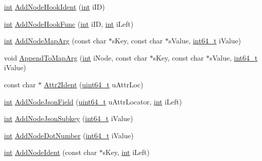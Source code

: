 \begin{DoxyCompactItemize}
\item 
\hyperlink{sphinxexpr_8cpp_a4a26e8f9cb8b736e0c4cbf4d16de985e}{int} \hyperlink{classExprParser__t_a31fa2dee046bcf1351fdcad5d32e8a59}{Add\-Node\-Hook\-Ident} (\hyperlink{sphinxexpr_8cpp_a4a26e8f9cb8b736e0c4cbf4d16de985e}{int} i\-I\-D)
\item 
\hyperlink{sphinxexpr_8cpp_a4a26e8f9cb8b736e0c4cbf4d16de985e}{int} \hyperlink{classExprParser__t_a25d811a727cd9cf9132578d8eb954711}{Add\-Node\-Hook\-Func} (\hyperlink{sphinxexpr_8cpp_a4a26e8f9cb8b736e0c4cbf4d16de985e}{int} i\-I\-D, \hyperlink{sphinxexpr_8cpp_a4a26e8f9cb8b736e0c4cbf4d16de985e}{int} i\-Left)
\item 
\hyperlink{sphinxexpr_8cpp_a4a26e8f9cb8b736e0c4cbf4d16de985e}{int} \hyperlink{classExprParser__t_a399cc3ba50a9fb3279cce14ac59190c6}{Add\-Node\-Map\-Arg} (const char $\ast$s\-Key, const char $\ast$s\-Value, \hyperlink{sphinxstd_8h_a996e72f71b11a5bb8b3b7b6936b1516d}{int64\-\_\-t} i\-Value)
\item 
void \hyperlink{classExprParser__t_abe7a23d9bf13b0e9e3c4b40ba6943caa}{Append\-To\-Map\-Arg} (\hyperlink{sphinxexpr_8cpp_a4a26e8f9cb8b736e0c4cbf4d16de985e}{int} i\-Node, const char $\ast$s\-Key, const char $\ast$s\-Value, \hyperlink{sphinxstd_8h_a996e72f71b11a5bb8b3b7b6936b1516d}{int64\-\_\-t} i\-Value)
\item 
const char $\ast$ \hyperlink{classExprParser__t_a8da806929f26afc62899fe2d5e31fe98}{Attr2\-Ident} (\hyperlink{sphinxstd_8h_aaa5d1cd013383c889537491c3cfd9aad}{uint64\-\_\-t} u\-Attr\-Loc)
\item 
\hyperlink{sphinxexpr_8cpp_a4a26e8f9cb8b736e0c4cbf4d16de985e}{int} \hyperlink{classExprParser__t_aef09b06a53d6e264a2f14abd4c3389e6}{Add\-Node\-Json\-Field} (\hyperlink{sphinxstd_8h_aaa5d1cd013383c889537491c3cfd9aad}{uint64\-\_\-t} u\-Attr\-Locator, \hyperlink{sphinxexpr_8cpp_a4a26e8f9cb8b736e0c4cbf4d16de985e}{int} i\-Left)
\item 
\hyperlink{sphinxexpr_8cpp_a4a26e8f9cb8b736e0c4cbf4d16de985e}{int} \hyperlink{classExprParser__t_a8f317aa80ef8d91a12756533d6ff4547}{Add\-Node\-Json\-Subkey} (\hyperlink{sphinxstd_8h_a996e72f71b11a5bb8b3b7b6936b1516d}{int64\-\_\-t} i\-Value)
\item 
\hyperlink{sphinxexpr_8cpp_a4a26e8f9cb8b736e0c4cbf4d16de985e}{int} \hyperlink{classExprParser__t_a9f1c931cf68b08fe4d9e8c847b2e0c35}{Add\-Node\-Dot\-Number} (\hyperlink{sphinxstd_8h_a996e72f71b11a5bb8b3b7b6936b1516d}{int64\-\_\-t} i\-Value)
\item 
\hyperlink{sphinxexpr_8cpp_a4a26e8f9cb8b736e0c4cbf4d16de985e}{int} \hyperlink{classExprParser__t_af124a36a8a44766ecdca604616d7a989}{Add\-Node\-Ident} (const char $\ast$s\-Key, \hyperlink{sphinxexpr_8cpp_a4a26e8f9cb8b736e0c4cbf4d16de985e}{int} i\-Left)
\end{DoxyCompactItemize}
